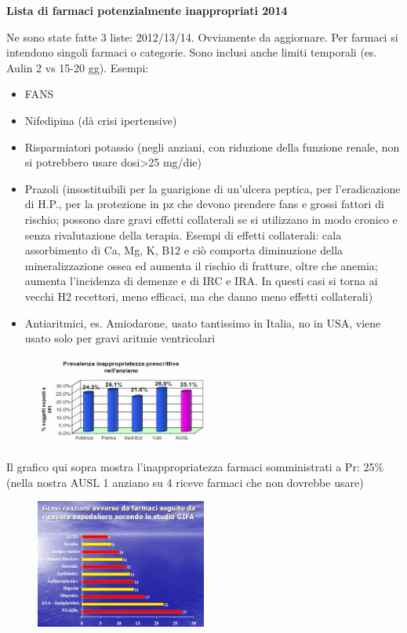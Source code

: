  \textbf{Lista di farmaci potenzialmente inappropriati 2014}

  Ne sono state fatte 3 liste: 2012/13/14. Ovviamente da aggiornare. Per
  farmaci si intendono singoli farmaci o categorie. Sono inclusi anche
  limiti temporali (es. Aulin 2 vs 15-20 gg). Esempi:

\begin{itemize}
\item
  FANS
\item
  Nifedipina (dà crisi ipertensive)
\item
  Risparmiatori potassio (negli anziani, con riduzione della funzione
  renale, non si potrebbero usare dosi\textgreater{}25 mg/die)
\item
  Prazoli (insostituibili per la guarigione di un'ulcera peptica, per
  l'eradicazione di H.P., per la protezione in pz che devono prendere
  fans e grossi fattori di rischio; possono dare gravi effetti
  collaterali se si utilizzano in modo cronico e senza rivalutazione
  della terapia. Esempi di effetti collaterali: cala assorbimento di Ca,
  Mg, K, B12 e ciò comporta diminuzione della mineralizzazione ossea ed
  aumenta il rischio di fratture, oltre che anemia; aumenta l'incidenza
  di demenze e di IRC e IRA. In questi casi si torna ai vecchi H2
  recettori, meno efficaci, ma che danno meno effetti collaterali)
\item
  Antiaritmici, es. Amiodarone, usato tantissimo in Italia, no in USA,
  viene usato solo per gravi aritmie ventricolari
\end{itemize}

\begin{figure}[!ht]
\centering
	\includegraphics[width=0.5\textwidth]{37/image2.jpg}
	\end{figure}

  Il grafico qui sopra mostra l'inappropriatezza farmaci somministrati a
  Pr: 25\% (nella nostra AUSL 1 anziano su 4 riceve farmaci che non
  dovrebbe usare)

\begin{figure}[!ht]
\centering
	\includegraphics[width=0.5\textwidth]{37/image3.jpg}
	\end{figure}

